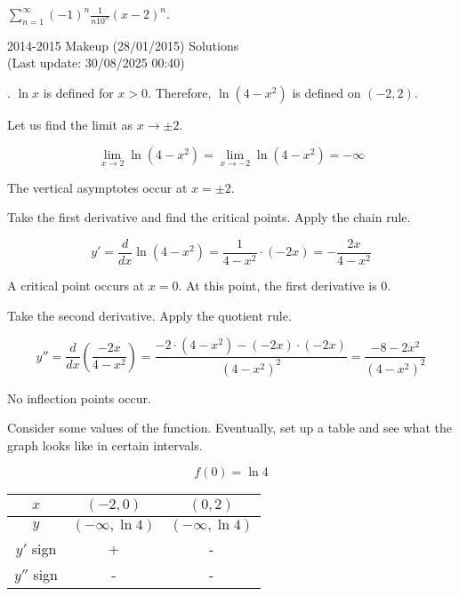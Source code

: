 \documentclass{article}
\begin{document}
\hfill

\noindent $\displaystyle\sum_{n=1}^\infty(-1)^n\frac1{n10^n}(x-2)^n$.

\newpage

\begin{center}
2014-2015 Makeup (28/01/2015) Solutions\\
(Last update: 30/08/2025 00:40)
\end{center}

. $\ln x$ is defined for $x>0$. Therefore, $\ln\left(4-x^2\right)$ is defined on $(-2,2)$.

\hfill

\noindent Let us find the limit as $x\to\pm2$.

\begin{equation*}\lim_{x\to2}\ln\left(4-x^2\right)=\lim_{x\to-2}\ln\left(4-x^2\right)=-\infty\end{equation*}

\hfill

\noindent The vertical asymptotes occur at $x=\pm2$.

\hfill

\noindent Take the first derivative and find the critical points. Apply the chain rule.

\[y'=\frac d{dx}\ln\left(4-x^2\right)=\frac1{4-x^2}\cdot(-2x)=-\frac{2x}{4-x^2}\]

\hfill

\noindent A critical point occurs at $x=0$. At this point, the first derivative is $0$.

\hfill

\noindent Take the second derivative. Apply the quotient rule.

\[y''=\frac d{dx}\left(\frac{-2x}{4-x^2}\right)=\frac{-2\cdot(4-x^2)-(-2x)\cdot(-2x)}{\left(4-x^2\right)^2}=\frac{-8-2x^2}{\left(4-x^2\right)^2}\]

\hfill

\noindent No inflection points occur.

\hfill

\noindent Consider some values of the function. Eventually, set up a table and see what the graph looks like in certain intervals.

\begin{equation*}f(0)=\ln4\end{equation*}

\begin{center}
    \large
    \begin{tabular}{|c|cc|} 
    \hline
        $x$&$\left(-2,0\right)$&$\left(0,2\right)$\\
        \hline
        $y$&$(-\infty,\ln4)$&$(-\infty,\ln4)$\\
        \hline
        $y'$ sign&+&-\\
        \hline
        $y''$ sign&-&-\\
        \hline
    \end{tabular}
\end{center}
\end{document}
